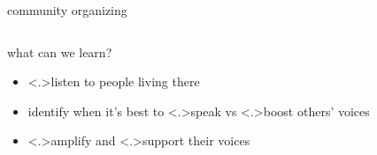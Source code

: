 \documentclass[aspectratio=43,17pt]{beamer} %
\begin{document}
\begin{frame}{community organizing}
\begin{columns}
\begin{column}{0.33\textwidth}

\end{column}
\end{columns}

\end{frame}



\begin{frame}{what can we learn?}
    
\begin{itemize}
  \item<+-> \alt<.>{}{listen} to people living there
  \item<+-> identify when it's best to \alt<.>{}{speak} vs \alt<.>{}{boost} others' voices
  \item<+-> \alt<.>{}{amplify} and \alt<.>{}{support} their voices
\end{itemize}

\end{frame}
\end{document}
